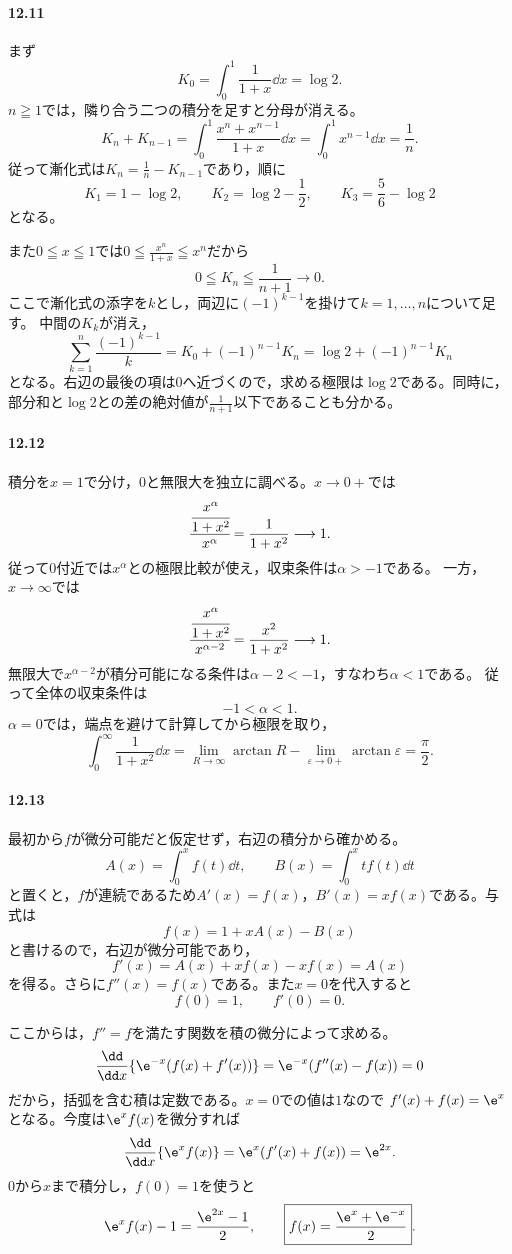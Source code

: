 \paragraph{12.11}
まず
\[
 K_0=\int_0^1\frac1{1+x}\dd x=\log2.
\]
$n\geqq1$では，隣り合う二つの積分を足すと分母が消える。
\[
 K_n+K_{n-1}
 =\int_0^1\frac{x^n+x^{n-1}}{1+x}\dd x
 =\int_0^1x^{n-1}\dd x=\frac1n.
\]
従って漸化式は$K_n=\frac1n-K_{n-1}$であり，順に
\[
 K_1=1-\log2,\qquad
 K_2=\log2-\frac12,\qquad
 \boxed{K_3=\frac56-\log2}
\]
となる。

また$0\leqq x\leqq1$では$0\leqq\frac{x^n}{1+x}\leqq x^n$だから
\[
 0\leqq K_n\leqq\frac1{n+1}\longrightarrow0.
\]
ここで漸化式の添字を$k$とし，両辺に$(-1)^{k-1}$を掛けて$k=1,\ldots,n$について足す。
中間の$K_k$が消え，
\[
 \sum_{k=1}^n\frac{(-1)^{k-1}}k
 =K_0+(-1)^{n-1}K_n
 =\log2+(-1)^{n-1}K_n
\]
となる。右辺の最後の項は$0$へ近づくので，求める極限は$\log2$である。同時に，部分和と$\log2$との差の絶対値が$\frac1{n+1}$以下であることも分かる。

\paragraph{12.12}
積分を$x=1$で分け，$0$と無限大を独立に調べる。$x\to0+$では
\[
 \cfrac{\cfrac{x^\alpha}{1+x^2}}{x^\alpha}
 =\frac1{1+x^2}\longrightarrow1.
\]
従って$0$付近では$x^\alpha$との極限比較が使え，収束条件は$\alpha>-1$である。
一方，$x\to\infty$では
\[
 \cfrac{\cfrac{x^\alpha}{1+x^2}}{x^{\alpha-2}}
 =\frac{x^2}{1+x^2}\longrightarrow1.
\]
無限大で$x^{\alpha-2}$が積分可能になる条件は$\alpha-2<-1$，すなわち$\alpha<1$である。
従って全体の収束条件は
\[
 \boxed{-1<\alpha<1}.
\]
$\alpha=0$では，端点を避けて計算してから極限を取り，
\[
 \int_0^{\infty}\frac1{1+x^2}\dd x
 =\lim_{R\to\infty}\arctan R-\lim_{\varepsilon\to0+}\arctan\varepsilon
 =\boxed{\frac{\pi}{2}}.
\]

\paragraph{12.13}
最初から$f$が微分可能だと仮定せず，右辺の積分から確かめる。
\[
 A(x)=\int_0^xf(t)\dd t,\qquad
 B(x)=\int_0^xtf(t)\dd t
\]
と置くと，$f$が連続であるため$A'(x)=f(x)$，$B'(x)=xf(x)$である。与式は
\[
 f(x)=1+xA(x)-B(x)
\]
と書けるので，右辺が微分可能であり，
\[
 f'(x)=A(x)+xf(x)-xf(x)=A(x)
\]
を得る。さらに$f''(x)=f(x)$である。また$x=0$を代入すると
\[
 f(0)=1,\qquad f'(0)=0.
\]

ここからは，$f''=f$を満たす関数を積の微分によって求める。
\[
 \frac{\dd}{\dd x}\{\e^{-x}(f(x)+f'(x))\}
 =\e^{-x}(f''(x)-f(x))=0
\]
だから，括弧を含む積は定数である。$x=0$での値は$1$なので
$f'(x)+f(x)=\e^x$となる。今度は$\e^xf(x)$を微分すれば
\[
 \frac{\dd}{\dd x}\{\e^xf(x)\}=\e^x(f'(x)+f(x))=\e^{2x}.
\]
$0$から$x$まで積分し，$f(0)=1$を使うと
\[
 \e^xf(x)-1=\frac{\e^{2x}-1}{2},\qquad
 \boxed{f(x)=\frac{\e^x+\e^{-x}}2}.
\]

